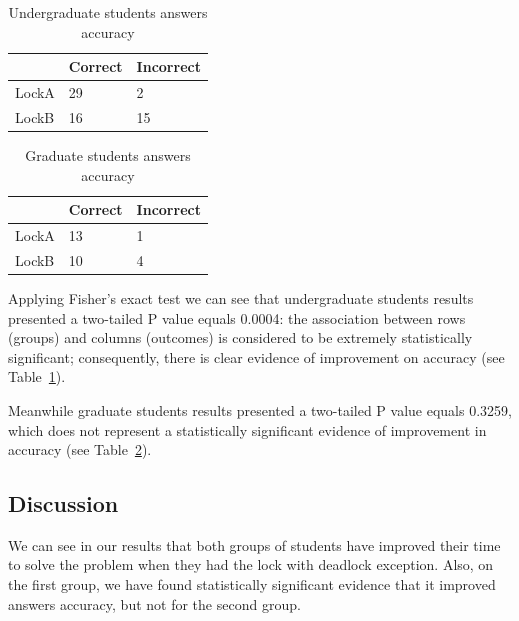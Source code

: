 \begin{table}
\begin{center}
\caption{Undergraduate students answers accuracy}\label{tab:acc1}
\begin{tabular}{|l|l|l|}
\hline
 & Correct & Incorrect\\
\hline
LockA & 29 & 2\\
LockB & 16 & 15\\
\hline
\end{tabular}
\end{center}
\end{table}

\begin{table}
\begin{center}
\caption{Graduate students answers accuracy}\label{tab:acc2}
\begin{tabular}{|l|l|l|}
\hline
 & Correct & Incorrect\\
\hline
LockA & 13 & 1\\
LockB & 10 & 4\\
\hline
\end{tabular}
\end{center}
\end{table}

Applying Fisher's exact test we can see that undergraduate students results presented a two-tailed P value equals 0.0004: the association between rows (groups) and columns (outcomes) is considered to be extremely statistically significant; consequently, there is clear evidence of improvement on accuracy (see Table~\ref{tab:acc1}).

Meanwhile graduate students results presented a two-tailed P value equals 0.3259, which does not represent a statistically significant evidence of improvement in accuracy (see Table~\ref{tab:acc2}).


\subsection{Discussion}


We can see in our results that both groups of students have improved their time to solve the problem when they had the lock with deadlock exception. Also, on the first group, we have found statistically significant evidence that it improved answers accuracy, but not for the second group.

